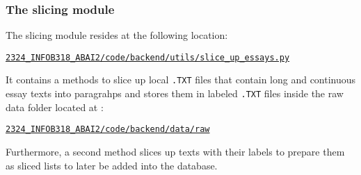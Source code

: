 \subsubsection{The slicing module}
The slicing module resides at the following location: 
\begin{codebox}
    \large\href{https://github.com/UNamurCSFaculty/2324_INFOB318_ABAI2/blob/main/code/backend/utils/slice_up_essays.py}{\texttt{2324\_INFOB318\_ABAI2/code/backend/utils/slice\_up\_essays.py}}
\end{codebox}
It contains a methods to slice up local \texttt{.TXT} files that contain long and continuous essay texts into paragrahps and stores them in labeled \texttt{.TXT} files inside the raw data folder located at :
\begin{codebox}
    \large\href{https://github.com/UNamurCSFaculty/2324_INFOB318_ABAI2/blob/main/code/backend/data/raw}{\texttt{2324\_INFOB318\_ABAI2/code/backend/data/raw}}
\end{codebox}
Furthermore, a second method slices up texts with their labels to prepare them as sliced lists to later be added into the database. 


